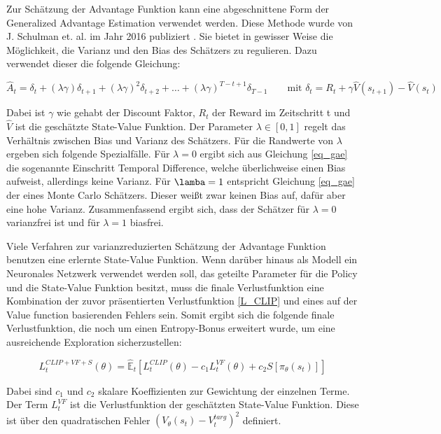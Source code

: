 Zur Schätzung der Advantage Funktion kann eine abgeschnittene Form der Generalized Advantage Estimation verwendet werden. Diese Methode wurde von J. Schulman et. al. im Jahr 2016 publiziert \cite{GAE}. Sie bietet in gewisser Weise die Möglichkeit, die Varianz und den Bias des Schätzers zu regulieren. Dazu verwendet dieser die folgende Gleichung:

\begin{equation}
  \hat{A}_t = \delta_t + (\lambda \gamma) \delta_{t+1} + (\lambda \gamma)^2 \delta_{t+2} + \dots + (\lambda \gamma)^{T-t+1} \delta_{T-1} \qquad \text{mit } \delta_t = R_t + \gamma \hat{V}(s_{t+1}) - \hat{V}(s_t)
  \label{eq_gae}
\end{equation}

Dabei ist $\gamma$ wie gehabt der Discount Faktor, $R_t$ der Reward im Zeitschritt t und $\hat{V}$ ist die geschätzte State-Value Funktion. Der Parameter $\lambda \in [0, 1]$ regelt das Verhältnis zwischen Bias und Varianz des Schätzers. Für die Randwerte von $\lambda$ ergeben sich folgende Spezialfälle. Für $\lambda = 0$ ergibt sich aus Gleichung \ref{eq_gae} die sogenannte Einschritt Temporal Difference, welche überlichweise einen Bias aufweist, allerdings keine Varianz. Für $\lamba = 1$ entspricht Gleichung \ref{eq_gae} der eines Monte Carlo Schätzers. Dieser weißt zwar keinen Bias auf, dafür aber eine hohe Varianz. Zusammenfassend ergibt sich, dass der Schätzer für $\lambda = 0$ varianzfrei ist und für $\lambda = 1$ biasfrei.

Viele Verfahren zur varianzreduzierten Schätzung der Advantage Funktion benutzen eine erlernte State-Value Funktion. Wenn darüber hinaus als Modell ein Neuronales Netzwerk verwendet werden soll, das geteilte Parameter für die Policy und die State-Value Funktion besitzt, muss die finale Verlustfunktion eine Kombination der zuvor präsentierten Verlustfunktion \eqref{L_CLIP} und eines auf der Value function basierenden Fehlers sein. Somit ergibt sich die folgende finale Verlustfunktion, die noch um einen Entropy-Bonus erweitert wurde, um eine ausreichende Exploration sicherzustellen:

\begin{equation}
	L_t^{CLIP+VF+S}(\theta) = \hat{\mathbb{E}}_t[L_t^{CLIP}(\theta) - c_1 L_t^{VF}(\theta) + c_2 S[\pi_\theta(s_t)]]
  \label{L_gesamt}
\end{equation}

Dabei sind $c_1$ und $c_2$ skalare Koeffizienten zur Gewichtung der einzelnen Terme. Der Term $L_t^{VF}$ ist die Verlustfunktion der geschätzten State-Value Funktion. Diese ist über den quadratischen Fehler $(V_\theta(s_t) - V_t^{targ})^2$ definiert.

